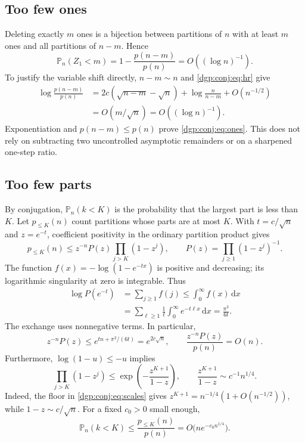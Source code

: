 \documentclass[11pt,letterpaper]{article}
\numberwithin{equation}{section}
\theoremstyle{remark}\newtheorem{remark}[theorem]{Remark}
\newcommand{\PP}{\mathbb P}
\newcommand{\dd}{\,\mathrm d}
\begin{document}
\subsection{Too few ones}
Deleting exactly $m$ ones is a bijection between partitions of $n$
with at least $m$ ones and all partitions of $n-m$. Hence
\begin{equation}\label{dgp:conj:eq:ones}
 \PP_n(Z_1<m)=1-\frac{p(n-m)}{p(n)}=O((\log n)^{-1}).
\end{equation}
To justify the variable shift directly, $n-m\sim n$ and
\eqref{dgp:conj:eq:hr} give
\begin{align*}
 \log\frac{p(n-m)}{p(n)}
 &=2c(\sqrt{n-m}-\sqrt n)+\log\frac n{n-m}+O(n^{-1/2})\\
 &=O(m/\sqrt n)=O((\log n)^{-1}).
\end{align*}
Exponentiation and $p(n-m)\leq p(n)$ prove \eqref{dgp:conj:eq:ones}.
This does not rely on subtracting two uncontrolled asymptotic
remainders or on a sharpened one-step ratio.

\subsection{Too few parts}
By conjugation, $\PP_n(k<K)$ is the probability that the largest part
is less than $K$. Let $p_{\leq K}(n)$ count partitions whose parts
are at most $K$. With $t=c/\sqrt n$ and $z=e^{-t}$, coefficient
positivity in the ordinary partition product gives
\begin{equation}\label{dgp:conj:eq:productbound}
 p_{\leq K}(n)\leq z^{-n}P(z)\prod_{j>K}(1-z^j),
 \qquad P(z)=\prod_{j\geq1}(1-z^j)^{-1}.
\end{equation}
The function $f(x)=-\log(1-e^{-tx})$ is positive and decreasing;
its logarithmic singularity at zero is integrable. Thus
\begin{align*}
 \log P(e^{-t})&=\sum_{j\geq1}f(j)
 \leq\int_0^\infty f(x)\dd x\\
 &=\sum_{\ell\geq1}\frac1\ell\int_0^\infty e^{-t\ell x}\dd x
 =\frac{\pi^2}{6t}.
\end{align*}
The exchange uses nonnegative terms. In particular,
\[
 z^{-n}P(z)\leq e^{tn+\pi^2/(6t)}=e^{2c\sqrt n},
 \qquad \frac{z^{-n}P(z)}{p(n)}=O(n).
\]
Furthermore, $\log(1-u)\leq-u$ implies
\begin{equation}\label{dgp:conj:eq:tailproduct}
 \prod_{j>K}(1-z^j)
 \leq\exp\left(-\frac{z^{K+1}}{1-z}\right),\qquad
 \frac{z^{K+1}}{1-z}\sim c^{-1}n^{1/4}.
\end{equation}
Indeed, the floor in \eqref{dgp:conj:eq:scales} gives
$z^{K+1}=n^{-1/4}(1+O(n^{-1/2}))$, while
$1-z\sim c/\sqrt n$. For a fixed $c_0>0$ small enough,
\begin{equation}\label{dgp:conj:eq:length}
 \PP_n(k<K)\leq\frac{p_{\leq K}(n)}{p(n)}
 =O\bigl(n e^{-c_0n^{1/4}}\bigr).
\end{equation}
\end{document}
